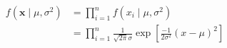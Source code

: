 \documentclass{jlreq}
\begin{document}
\begin{align*}
  f(\bm{x} \mid \mu, \sigma^2) &= \prod^{n}_{i=1} f(x_{i} \mid \mu, \sigma^2) \\
                               &= \prod^{n}_{i=1} \frac{1}{\sqrt{2\pi}\sigma} \exp \left[ \frac{-1}{2\sigma^2}(x - \mu)^2 \right]
\end{align*}
\end{document}
